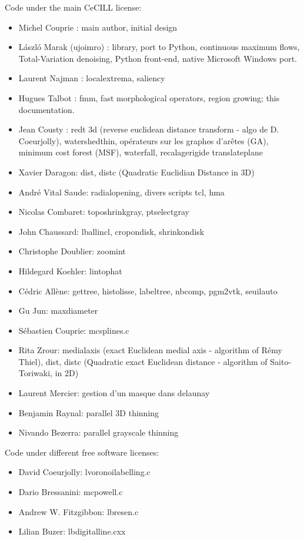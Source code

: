 Code under the main CeCILL license:
\begin{itemize}
\item Michel Couprie : main author, initial design
\item László Marak (ujoimro) : library, port to Python, continuous maximum flows, Total-Variation denoising, Python front-end, native Microsoft Windows port.
\item Laurent Najman : localextrema, saliency
\item Hugues Talbot : fmm, fast morphological operators, region growing; this documentation.
\item Jean Cousty : redt 3d (reverse euclidean distance transform - algo de D. Coeurjolly), watershedthin, opérateurs sur les graphes d'arêtes (GA), minimum cost forest (MSF), waterfall, recalagerigide translateplane
\item Xavier Daragon: dist, distc (Quadratic Euclidian Distance in 3D)
\item André Vital Saude: radialopening, divers scripts tcl, hma
\item Nicolas Combaret: toposhrinkgray, ptselectgray
\item John Chaussard: lballincl, cropondisk, shrinkondisk
\item Christophe Doublier: zoomint
\item Hildegard Koehler: lintophat
\item Cédric Allène: gettree, histolisse, labeltree, nbcomp, pgm2vtk, seuilauto
\item Gu Jun: maxdiameter
\item Sébastien Couprie: mcsplines.c
\item Rita Zrour: medialaxis (exact Euclidean medial axis - algorithm of Rémy Thiel), dist, distc (Quadratic exact Euclidean distance - algorithm of Saito-Toriwaki, in 2D)
\item Laurent Mercier: gestion d'un masque dans delaunay
\item Benjamin Raynal: parallel 3D thinning
\item Nivando Bezerra: parallel grayscale thinning
\end{itemize}

Code under different free software licenses:
\begin{itemize}
\item David Coeurjolly: lvoronoilabelling.c
\item Dario Bressanini: mcpowell.c
\item Andrew W. Fitzgibbon: lbresen.c
\item Lilian Buzer: lbdigitalline.cxx
\end{itemize}